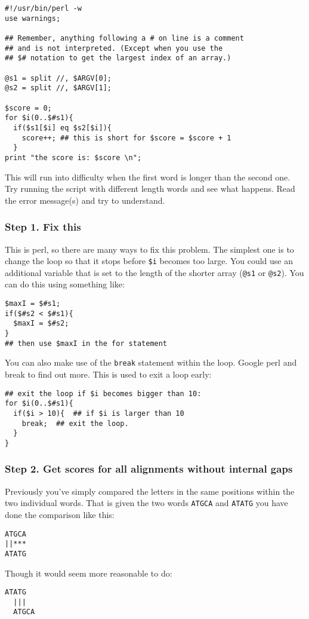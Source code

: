 \documentclass[11pt]{article}
\renewcommand\scriptsize\normalsize
\begin{document}
\begin{verbatim}
#!/usr/bin/perl -w
use warnings;

## Remember, anything following a # on line is a comment
## and is not interpreted. (Except when you use the
## $# notation to get the largest index of an array.)

@s1 = split //, $ARGV[0];
@s2 = split //, $ARGV[1];

$score = 0;
for $i(0..$#s1){
  if($s1[$i] eq $s2[$i]){
    score++; ## this is short for $score = $score + 1
  }
print "the score is: $score \n";
\end{verbatim}

This will run into difficulty when the first word is longer than
the second one. Try running the script with different length words
and see what happens. Read the error message(s) and try to understand.

\subsubsection{Step 1. Fix this}
\label{sec-1-3-1}
This is perl, so there are many ways to fix this problem. The simplest
one is to change the loop so that it stops before \texttt{\$i} becomes
too large. You could use an additional variable that is set to the
length of the shorter array (\texttt{@s1} or \texttt{@s2}). 
You can do this using something like:

\begin{verbatim}
$maxI = $#s1;
if($#s2 < $#s1){
  $maxI = $#s2;
}
## then use $maxI in the for statement
\end{verbatim}

You can also make use of the \texttt{break} statement within the loop.
Google perl and break to find out more. This is used to exit a loop
early:

\begin{verbatim}
## exit the loop if $i becomes bigger than 10:
for $i(0..$#s1){
  if($i > 10){  ## if $i is larger than 10
    break;  ## exit the loop.
  }
}
\end{verbatim}

\subsubsection{Step 2. Get scores for all alignments without internal gaps}
\label{sec-1-3-2}
Previously you've simply compared the letters in the same positions
within the two individual words. That is given the two words \texttt{ATGCA}
and \texttt{ATATG} you have done the comparison like this:
\begin{verbatim}
ATGCA
||***
ATATG
\end{verbatim}
Though it would seem more reasonable to do:
\begin{verbatim}
ATATG
  |||
  ATGCA
\end{verbatim}
\end{document}
